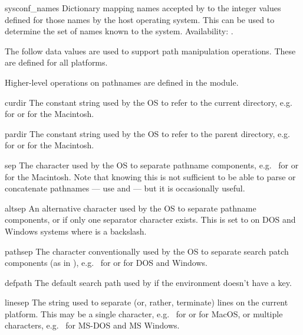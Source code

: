 \begin{datadesc}{sysconf_names}
Dictionary mapping names accepted by  to the
integer values defined for those names by the host operating system.
This can be used to determine the set of names known to the system.
Availability: \UNIX.
\end{datadesc}


The follow data values are used to support path manipulation
operations.  These are defined for all platforms.

Higher-level operations on pathnames are defined in the
 module.


\begin{datadesc}{curdir}
The constant string used by the OS to refer to the current directory,
e.g.\  for \POSIX{} or  for the Macintosh.
\end{datadesc}

\begin{datadesc}{pardir}
The constant string used by the OS to refer to the parent directory,
e.g.\  for \POSIX{} or  for the Macintosh.
\end{datadesc}

\begin{datadesc}{sep}
The character used by the OS to separate pathname components,
e.g.\ \character{/} for \POSIX{} or \character{:} for the Macintosh.
Note that knowing this is not sufficient to be able to parse or
concatenate pathnames --- use  and
 --- but it is occasionally useful.
\end{datadesc}

\begin{datadesc}{altsep}
An alternative character used by the OS to separate pathname components,
or  if only one separator character exists.  This is set to
\character{/} on DOS and Windows systems where  is a backslash.
\end{datadesc}

\begin{datadesc}{pathsep}
The character conventionally used by the OS to separate search patch
components (as in ), e.g.\ \character{:} for \POSIX{} or
\character{;} for DOS and Windows.
\end{datadesc}

\begin{datadesc}{defpath}
The default search path used by  if the environment
doesn't have a  key.
\end{datadesc}

\begin{datadesc}{linesep}
The string used to separate (or, rather, terminate) lines on the
current platform.  This may be a single character,
e.g.\  for \POSIX{} or  for MacOS, or multiple
characters, e.g.\  for MS-DOS and MS Windows.
\end{datadesc}

